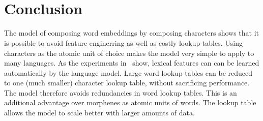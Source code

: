 \documentclass[twoside,11pt,a4paper]{article}
\newcommand*{\Frac}[2]{\frac{\displaystyle #1}{\displaystyle #2}}
\theoremstyle{break}
\begin{document}
\newpage
\ 
\newpage

%
%
%
%
%
\pagestyle{headings}
\tableofcontents
\listoftables
\listoffigures
\newpage
\pagestyle{empty}
\ 
\newpage
\pagestyle{headings}

%
%
%
%














\section{Conclusion}

The model of composing word embeddings by composing characters shows that it is possible to avoid
feature enginerring as well as costly lookup-tables.
Using characters as the atomic unit of choice makes the model very simple to apply to many languages.
As the experiments in~\cite{DBLP:journals/corr/LingLMAADBT15} show, lexical features can
can be learned automatically by the language model. Large word lookup-tables
can be reduced to one (much smaller) character lookup table, without sacrificing performance. 
The model therefore avoids redundancies in word lookup tables. This is an additional advantage over
morphenes as atomic units of words. The lookup table allows the model to scale better with
larger amounts of data.
\end{document}
